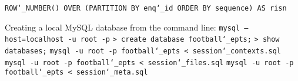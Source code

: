 \texttt{ROW\char`_NUMBER() OVER (PARTITION BY enq\char`_id ORDER BY sequence) AS risn}

\vspace{\baselineskip}
Creating a local MySQL database from the command line:\newline
\texttt{mysql --host=localhost -u root -p}\newline
\texttt{> create database football\char`_epts;}\newline
\texttt{> show databases;}\newline\newline
\texttt{mysql -u root -p football\char`_epts < session\char`_contexts.sql}\newline
\texttt{mysql -u root -p football\char`_epts < session\char`_files.sql}\newline
\texttt{mysql -u root -p football\char`_epts < session\char`_meta.sql}\newline

\newpage